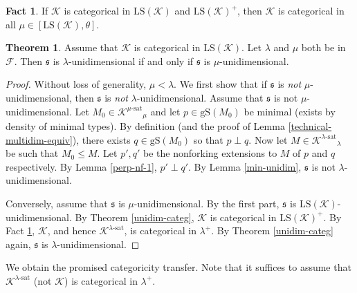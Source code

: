 \documentclass[12pt]{amsart}
\theoremstyle{definition}
\newtheorem{thm}[mydef]{Theorem}
\newtheorem{fact}[mydef]{Fact}
\begin{document}
\begin{fact}\label{upward-transfer-2}
  If ${\mathcal{K}}$ is categorical in ${\text{LS}} ({\mathcal{K}})$ and ${\text{LS}} ({\mathcal{K}})^+$, then ${\mathcal{K}}$ is categorical in all $\mu \in [{\text{LS}} ({\mathcal{K}}), \theta]$.
\end{fact}

\begin{thm}\label{unidim-transfer}
  Assume that ${\mathcal{K}}$ is categorical in ${\text{LS}} ({\mathcal{K}})$. Let $\lambda$ and $\mu$ both be in ${\mathcal{F}}$. Then ${\mathfrak{s}}$ is $\lambda$-unidimensional if and only if ${\mathfrak{s}}$ is $\mu$-unidimensional. 
\end{thm}
\begin{proof}
  Without loss of generality, $\mu < \lambda$. We first show that if ${\mathfrak{s}}$ is \emph{not} $\mu$-unidimensional, then ${\mathfrak{s}}$ is \emph{not} $\lambda$-unidimensional. Assume that ${\mathfrak{s}}$ is not $\mu$-unidimensional. Let $M_0 \in {{{{\mathcal{K}}}^{{{\mu}}\text{-sat}}}}_\mu$ and let $p \in {\text{gS}} (M_0)$ be minimal (exists by density of minimal types). By definition (and the proof of Lemma \ref{technical-multidim-equiv}), there exists $q \in {\text{gS}} (M_0)$ so that $p \perp q$. Now let $M \in {{{{\mathcal{K}}}^{{{\lambda}}\text{-sat}}}}_\lambda$ be such that $M_0 {\le} M$. Let $p', q'$ be the nonforking extensions to $M$ of $p$ and $q$ respectively. By Lemma \ref{perp-nf-1}, $p' \perp q'$. By Lemma \ref{min-unidim}, ${\mathfrak{s}}$ is not $\lambda$-unidimensional.

  Conversely, assume that ${\mathfrak{s}}$ is $\mu$-unidimensional. By the first part, ${\mathfrak{s}}$ is ${\text{LS}} ({\mathcal{K}})$-unidimensional. By Theorem \ref{unidim-categ}, ${\mathcal{K}}$ is categorical in ${\text{LS}} ({\mathcal{K}})^+$. By Fact \ref{upward-transfer-2}, ${\mathcal{K}}$, and hence ${{{{\mathcal{K}}}^{{{\lambda}}\text{-sat}}}}$, is categorical in $\lambda^+$. By Theorem \ref{unidim-categ} again, ${\mathfrak{s}}$ is $\lambda$-unidimensional.
\end{proof}

We obtain the promised categoricity transfer. Note that it suffices to assume that ${{{{\mathcal{K}}}^{{{\lambda}}\text{-sat}}}}$ (not ${\mathcal{K}}$) is categorical in $\lambda^+$.
\end{document}
